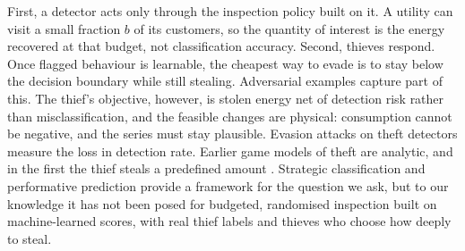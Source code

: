 \documentclass[journal]{IEEEtran}
\begin{document}
First, a detector acts only through the inspection policy built on it. A utility can visit a small fraction $b$ of its customers, so the quantity of interest is the energy recovered at that budget, not classification accuracy. Second, thieves respond. Once flagged behaviour is learnable, the cheapest way to evade is to stay below the decision boundary while still stealing. Adversarial examples \cite{goodfellow2015,madry2018} capture part of this. The thief's objective, however, is stolen energy net of detection risk rather than misclassification, and the feasible changes are physical: consumption cannot be negative, and the series must stay plausible. Evasion attacks on theft detectors \cite{li2020sff,takiddin2023,badr2023} measure the loss in detection rate. Earlier game models of theft \cite{cardenas2012,amin2015,lin2014} are analytic, and in the first the thief steals a predefined amount \cite{cardenas2012}. Strategic classification \cite{hardt2016} and performative prediction \cite{perdomo2020} provide a framework for the question we ask, but to our knowledge it has not been posed for budgeted, randomised inspection built on machine-learned scores, with real thief labels and thieves who choose how deeply to steal.
\end{document}
